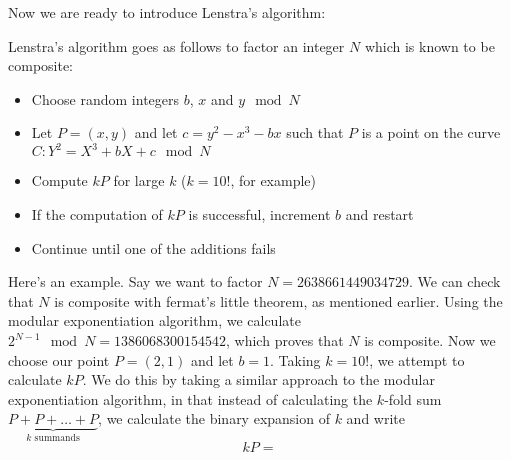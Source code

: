 Now we are ready to introduce Lenstra's algorithm:
\begin{definition}
	Lenstra's algorithm goes as follows to factor an integer $N$ which is known to be composite:
	\begin{itemize}
		\item Choose random integers $b$, $x$ and $y \mod N$
		\item Let $P = (x,y)$ and let $c = y^2 - x^3 - bx$ such that $P$ is a point on the curve $C: Y^2 = X^3 +bX + c \mod N$
		\item Compute $kP$ for large $k$ ($k=10!$, for example)
		\item If the computation of $kP$ is successful, increment $b$ and restart
		\item Continue until one of the additions fails
	\end{itemize}
\end{definition}

Here's an example.
Say we want to factor $N = 2638661449034729$.
We can check that $N$ is composite with fermat's little theorem, as mentioned earlier.
Using the modular exponentiation algorithm, we calculate $2^{N-1} \mod N = 1386068300154542$, which proves that $N$ is composite.
Now we choose our point $P = (2,1)$ and let $b = 1$.
Taking $k=10!$, we attempt to calculate $kP$.
We do this by taking a similar approach to the modular exponentiation algorithm, in that instead of calculating the $k$-fold sum $\underbrace{P+P+\ldots+P}_{k\text{ summands}}$, we calculate the binary expansion of $k$ and write
$$kP = $$

